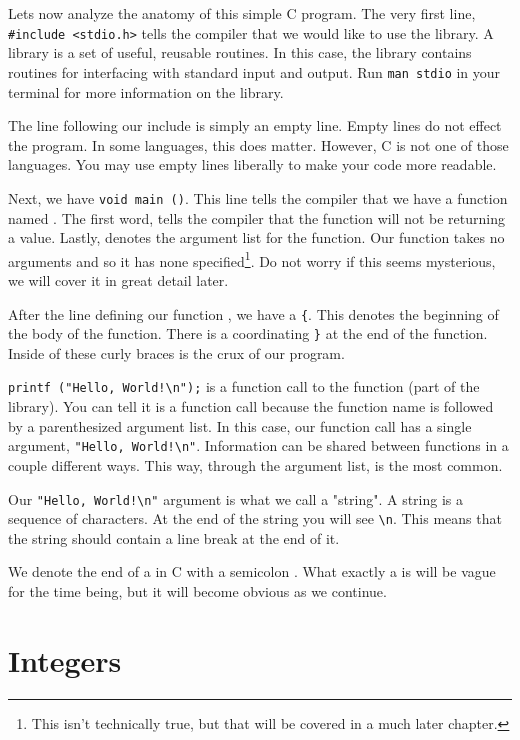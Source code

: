Lets now analyze the anatomy of this simple C program. The very first line,
\verb|#include <stdio.h>| tells the compiler that we would like to use the
 library. A library is a set of useful, reusable routines. In this
case, the  library contains routines for interfacing with standard
input and output. Run \verb|man stdio| in your terminal for more information on
the  library.

The line following our include is simply an empty line. Empty lines do not
effect the program. In some languages, this does matter. However, C is not one
of those languages. You may use empty lines liberally to make your code more
readable.

Next, we have \verb|void main ()|. This line tells the compiler that we have a
function named . The first word,  tells the compiler
that the function will not be returning a value. Lastly, \ident{()} denotes the
argument list for the function. Our  function takes no arguments
and so it has none specified\footnote[1]{This isn't technically true, but that
will be covered in a much later chapter.}. Do not worry if this seems
mysterious, we will cover it in great detail later.

After the line defining our function , we have a \verb|{|. This
denotes the beginning of the body of the function. There is a coordinating
\verb|}| at the end of the function. Inside of these curly braces is the crux
of our program.

\verb|printf ("Hello, World!\n");| is a function call to the 
function (part of the  library). You can tell it is a function
call because the function name is followed by a parenthesized argument list.
In this case, our function call has a single argument,
\verb|"Hello, World!\n"|. Information can be shared between functions in
a couple different ways. This way, through the argument list, is the most
common.

Our \verb|"Hello, World!\n"| argument is what we call a "string". A string
is a sequence of characters. At the end of the string you will see \verb|\n|.
This means that the string should contain a line break at the end of it.

We denote the end of a  in C with a semicolon \ident{;}.
What exactly a  is will be vague for the time being, but it
will become obvious as we continue.

\section{Integers}

